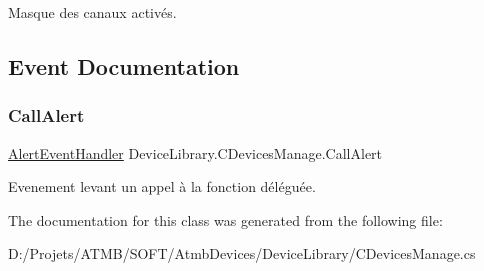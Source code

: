 Masque des canaux activés. 



\subsection{Event Documentation}
\mbox{\label{class_device_library_1_1_c_devices_manage_a6813f81d6f606f0aa66fb6613af6bbe8}} 
\subsubsection{\texorpdfstring{Call\+Alert}{CallAlert}}
{\footnotesize\ttfamily \mbox{\hyperlink{class_device_library_1_1_c_devices_manage_a76f84b8a18500338f67d33123aa3332a}{Alert\+Event\+Handler}} Device\+Library.\+C\+Devices\+Manage.\+Call\+Alert}



Evenement levant un appel à la fonction déléguée. 



The documentation for this class was generated from the following file\+:\begin{DoxyCompactItemize}
\item 
D\+:/\+Projets/\+A\+T\+M\+B/\+S\+O\+F\+T/\+Atmb\+Devices/\+Device\+Library/C\+Devices\+Manage.\+cs\end{DoxyCompactItemize}
